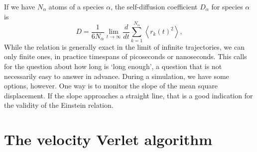 \documentclass[11pt,bibliography=totoc,index=totoc]{scrbook}   %
\begin{document}
If we have $N_{\alpha}$ atoms of a species $\alpha$, the self-diffusion coefficient $D_{\alpha}$ for species $\alpha$ is
\begin{equation}
  D = \frac{1}{6N_{\alpha}} \lim_{t\to\infty} \frac{d}{dt} \sum_{k=1}^{N_{\alpha}} \left \langle r_k(t)^2 \right\rangle,
  \label{eq:einstein-relation}
\end{equation}
While the relation is generally exact in the limit of infinite trajectories, we can only finite ones,
in practice timespans of picoseconds or nanoseconds.
This calls for the question about how long is `long enough', a question that is not necessarily easy to answer in advance.
During a simulation, we have some options, however. 
One way is to monitor the slope of the mean square displacement.
If the slope approaches a straight line, that is a good indication for the validity of the Einstein relation.


%
\section{The velocity Verlet algorithm}\label{sec:verlet}
%
\end{document}
